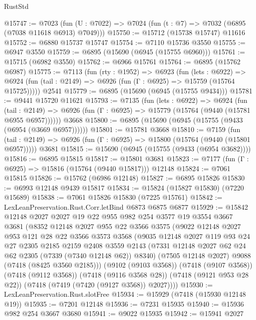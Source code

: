 \begin{lexlean}{RustStd}
\begin{coremodule}
@15747 := @7023
    (fun (U : @7022) => @7024 (fun (t : @7) => @7032 (@6895 (@7038 @11618 @6913) @7049)))
@15750 := @15712 (@15738 @15747) @11616
@15752 := @6880 @15737 @15747
@15754 := @7110 @15736 @3550
@15755 := @6947 @3550
@15759 := @6895 (@15690 (@6945 (@15755 @6960)))
@15761 := @15715 (@6982 @3550)
@15762 := @6966 @15761
@15764 := @6895 (@15762 @6987)
@15775 := @7113
    (fun (rty : @1952) =>
    @6923
      (fun (lets : @6922) =>
      @6924 (fun (tail : @2149) => @6926 (fun (Γ : @6925) => @15759 (@15764 @15725)))))
    @2541
@15779 := @6895 (@15690 (@6945 (@15755 @9434)))
@15781 := @9441 @15720 @11621
@15793 := @7135
    (fun (lets : @6922) =>
    @6924
      (fun (tail : @2149) =>
      @6926 (fun (Γ : @6925) => @15779 (@15764 (@9440 (@15781 @6955 @6957))))))
    @3668
@15800 := @6895 (@15690 (@6945 (@15755 (@9433 (@6954 (@3669 @6957))))))
@15801 := @15781 @3668
@15810 := @7159
    (fun (tail : @2149) => @6926 (fun (Γ : @6925) => @15800 (@15764 (@9440 (@15801 @6957)))))
    @3681
@15815 := @15690 (@6945 (@15755 (@9433 (@6954 @3682))))
@15816 := @6895 @15815
@15817 := @15801 @3681
@15823 := @7177 (fun (Γ : @6925) => @15816 (@15764 (@9440 @15817))) @12148
@15824 := @7061 @15815
@15826 := @15762 (@6986 @12148)
@15827 := @6895 @15826
@15830 := @6993 @12148 @9439 @15817
@15834 := @15824 (@15827 @15830) (@7220 @15689)
@15838 := @7061 @15826 @15830 (@7225 @15761)
@15842 := LexLeanPreservation.Rust.Corr.letBind @6873 @6875 @6877
@15929 := @15842
    @12148
    @2027
    @2027
    @19
    @22
    @955
    @982
    @254
    @3577
    @19
    @3554
    @3667
    @3681
    (@8352
      @12148
      @2027
      @955
      @22
      @3566
      @3575
      (@9022
        @12148
        @2027
        @953
        @121
        @28
        @22
        @3566
        @3573
        @3568
        (@9035
          @12148
          @2027
          @119
          @93
          @24
          @27
          @2305
          @2185
          @2159
          @2408
          @3559
          @2143
          (@7331 @12148 @2027 @62 @24 @62 @2305 (@7339 (@7340 @12148 @62)) @8340)
          (@7505 @12148 @2027)
          @9088
          (@7418 (@8425 @3560 @2185)))
        (@9102 (@9103 @3568))
        (@7418 (@9107 @3568))
        (@7418 (@9112 @3568))
        (@7418 (@9116 @3568 @28))
        (@7418 (@9121 @953 @28 @22))
        (@7418 (@7419 (@7420 (@9127 @3568)) @2027))))
@15930 := LexLeanPreservation.Rust.slotFree
@15934 := @15929 (@7418 (@15930 @12148 @19))
@15935 := @7201 @12148
@15936 := @7231 @15935
@15940 := @15936 @982 @254 @3667 @3680
@15941 := @9022 @15935
@15942 := @15941 @2027

\end{coremodule}
\end{lexlean}
